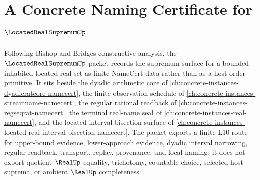 \chapter{A Concrete Naming Certificate for $\LocatedRealSupremumUp$}
\label{ch:concrete-instances-located-real-supremum-namecert}

Following Bishop and Bridges constructive analysis, the $\LocatedRealSupremumUp$ packet records the supremum surface for a bounded inhabited located real set as finite NameCert data rather than as a host-order primitive. It sits beside the dyadic arithmetic core of \autoref{ch:concrete-instances-dyadicratcore-namecert}, the finite observation schedule of \autoref{ch:concrete-instances-streamname-namecert}, the regular rational readback of \autoref{ch:concrete-instances-regseqrat-namecert}, the terminal real-name seal of \autoref{ch:concrete-instances-real-namecert}, and the located interval bisection surface of \autoref{ch:concrete-instances-located-real-interval-bisection-namecert}. The packet exports a finite L10 route for upper-bound evidence, lower-approach evidence, dyadic interval narrowing, regular readback, transport, replay, provenance, and local naming; it does not export quotient $\RealUp$ equality, trichotomy, countable choice, selected host suprema, or ambient $\RealUp$ completeness.

